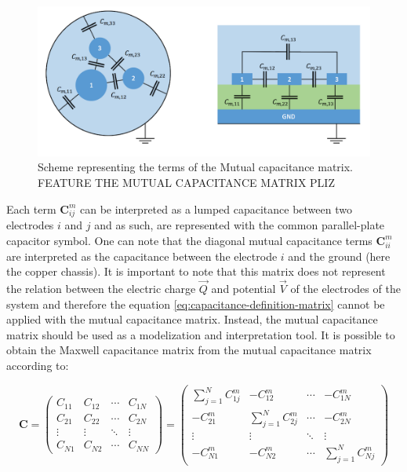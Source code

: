 \begin{figure}
\centering
\includegraphics[width=\linewidth]{Figures/Electrodes/lumped_capacitance_scheme.png}
\caption{Scheme representing the terms of the Mutual capacitance matrix. FEATURE THE MUTUAL CAPACITANCE MATRIX PLIZ}
\label{fig:lumped-capacitance}
\end{figure}

Each term $\bm{C}_{ij}^m$ can be interpreted as a lumped capacitance between two electrodes $i$ and $j$ and as such, are represented with the common parallel-plate capacitor symbol. One can note that the diagonal mutual capacitance terms $\bm{C}_{ii}^m$ are interpreted as the capacitance between the electrode $i$ and the ground (here the copper chassis). It is important to note that this matrix does not represent the relation between the electric charge $\vec{Q}$ and potential $\vec{V}$ of the electrodes of the system and therefore the equation \ref{eq:capacitance-definition-matrix} cannot be applied with the mutual capacitance matrix. Instead, the mutual capacitance matrix should be used as a modelization and interpretation tool. It is possible to obtain the Maxwell capacitance matrix from the mutual capacitance matrix according to:

\begin{equation} 
\label{eq:mutual-to-maxwell}
\bm{C} = 
\begin{pmatrix}
C_{11} & C_{12} & \cdots & C_{1N} \\ 
C_{21} & C_{22} & \cdots & C_{2N} \\ 
\vdots & \vdots & \ddots & \vdots \\ 
C_{N1} & C_{N2} & \cdots & C_{NN}
\end{pmatrix}
 = 
\begin{pmatrix}
\sum_{j=1}^N C_{1j}^m & -C_{12}^m & \cdots & -C_{1N}^m \\[0.3em]
-C_{21}^m & \sum_{j=1}^N C_{2j}^m & \cdots & -C_{2N}^m \\[0.3em]
\vdots & \vdots & \ddots & \vdots \\[0.3em] 
-C_{N1}^m & -C_{N2}^m & \cdots & \sum_{j=1}^N C_{Nj}^m
\end{pmatrix}
\end{equation}

